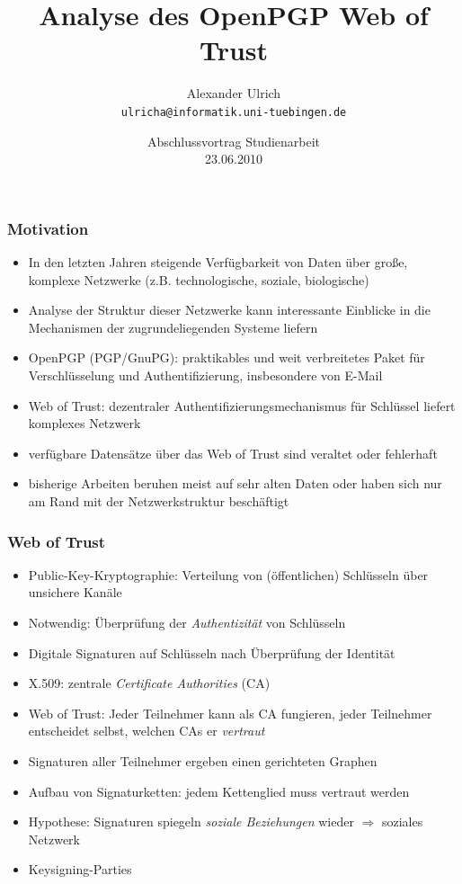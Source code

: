 \documentclass[10pt]{beamer}
\title{Analyse des OpenPGP Web of Trust}
\author{Alexander Ulrich \\ \texttt{ulricha@informatik.uni-tuebingen.de}}
\institute{Wilhelm-Schickard-Institut für Informatik\\
          Universität Tübingen}
\date{Abschlussvortrag Studienarbeit\\23.06.2010}
\begin{document}
\begin{frame}
  \titlepage
\end{frame}
\begin{frame}
  \frametitle{Motivation}
  \begin{itemize}
  \item In den letzten Jahren steigende Verf\"ugbarkeit von Daten
    \"uber gro{\ss}e, komplexe Netzwerke (z.B. technologische,
    soziale, biologische)
  \item Analyse der Struktur dieser Netzwerke kann interessante
    Einblicke in die Mechanismen der zugrundeliegenden Systeme liefern
  \item OpenPGP (PGP/GnuPG): praktikables und weit verbreitetes Paket
    f\"ur Verschl\"usselung und Authentifizierung, insbesondere von E-Mail
  \item Web of Trust: dezentraler Authentifizierungsmechanismus f\"ur
    Schl\"ussel liefert komplexes Netzwerk
  \item verf\"ugbare Datens\"atze \"uber das Web of Trust sind
    veraltet oder fehlerhaft
  \item bisherige Arbeiten beruhen meist auf sehr alten Daten oder
    haben sich nur am Rand mit der Netzwerkstruktur besch\"aftigt
  \end{itemize}
\end{frame}

\begin{frame}
  \frametitle{Web of Trust}
  \begin{itemize}
  \item Public-Key-Kryptographie: Verteilung von (\"offentlichen)
    Schl\"usseln \"uber unsichere Kan\"ale
  \item Notwendig: \"Uberpr\"ufung der \emph{Authentizit\"at} von
    Schl\"usseln
  \item Digitale Signaturen auf Schl\"usseln nach \"Uberpr\"ufung der
    Identit\"at
  \item X.509: zentrale \emph{Certificate Authorities} (CA)
  \item Web of Trust: Jeder Teilnehmer  kann als CA fungieren, jeder
    Teilnehmer entscheidet selbst, welchen CAs er \emph{vertraut}
  \item Signaturen aller Teilnehmer ergeben einen gerichteten Graphen
  \item Aufbau von Signaturketten: jedem Kettenglied muss vertraut
    werden
  \item Hypothese: Signaturen spiegeln \emph{soziale Beziehungen}
    wieder $\Rightarrow$ soziales Netzwerk
  \item Keysigning-Parties
  \end{itemize}
\end{frame}
\end{document}
